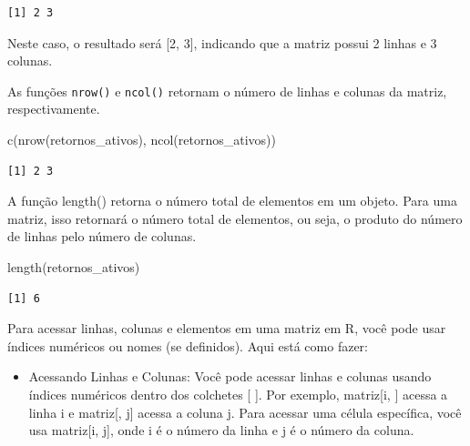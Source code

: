 \documentclass[
  portuguese,
  letterpaper,
  DIV=11,
  numbers=noendperiod]{scrreprt}
\newenvironment{Shaded}{\begin{snugshade}}{\end{snugshade}}
\newcommand{\FunctionTok}[1]{\textcolor[rgb]{0.28,0.35,0.67}{#1}}
\newcommand{\NormalTok}[1]{\textcolor[rgb]{0.00,0.23,0.31}{#1}}
\providecommand{\tightlist}{%
  \setlength{\itemsep}{0pt}\setlength{\parskip}{0pt}}
\theoremstyle{definition}
\theoremstyle{remark}
\begin{document}
\begin{verbatim}
[1] 2 3
\end{verbatim}

Neste caso, o resultado será {[}2, 3{]}, indicando que a matriz possui 2
linhas e 3 colunas.

As funções \texttt{nrow()} e \texttt{ncol()} retornam o número de linhas
e colunas da matriz, respectivamente.

\begin{Shaded}
\begin{Highlighting}[]
\FunctionTok{c}\NormalTok{(}\FunctionTok{nrow}\NormalTok{(retornos\_ativos), }\FunctionTok{ncol}\NormalTok{(retornos\_ativos))}
\end{Highlighting}
\end{Shaded}

\begin{verbatim}
[1] 2 3
\end{verbatim}

A função length() retorna o número total de elementos em um objeto. Para
uma matriz, isso retornará o número total de elementos, ou seja, o
produto do número de linhas pelo número de colunas.

\begin{Shaded}
\begin{Highlighting}[]
\FunctionTok{length}\NormalTok{(retornos\_ativos)}
\end{Highlighting}
\end{Shaded}

\begin{verbatim}
[1] 6
\end{verbatim}

Para acessar linhas, colunas e elementos em uma matriz em R, você pode
usar índices numéricos ou nomes (se definidos). Aqui está como fazer:

\begin{itemize}
\tightlist
\item
  Acessando Linhas e Colunas: Você pode acessar linhas e colunas usando
  índices numéricos dentro dos colchetes {[} {]}. Por exemplo,
  matriz{[}i, {]} acessa a linha i e matriz{[}, j{]} acessa a coluna j.
  Para acessar uma célula específica, você usa matriz{[}i, j{]}, onde i
  é o número da linha e j é o número da coluna.
\end{itemize}
\end{document}
